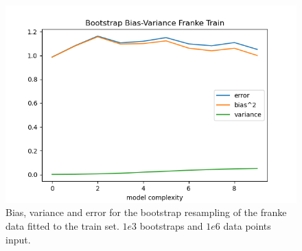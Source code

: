 \documentclass[12pt]{revtex4-2}
\begin{document}
\begin{figure}[hbtp]
\includegraphics[scale=0.7]{
	../plots/frankeBootstrapBiasVariancesigma1poly10boot1e3datapt1e6train.png}
\caption{
	Bias, variance and error for the bootstrap resampling of the franke data fitted to 
	the train set. $1e3$ bootstraps and $1e6$ data points input. 
	}
\label{fig:BootstrapBiasVariance1e6test}
\end{figure}


\end{document}
